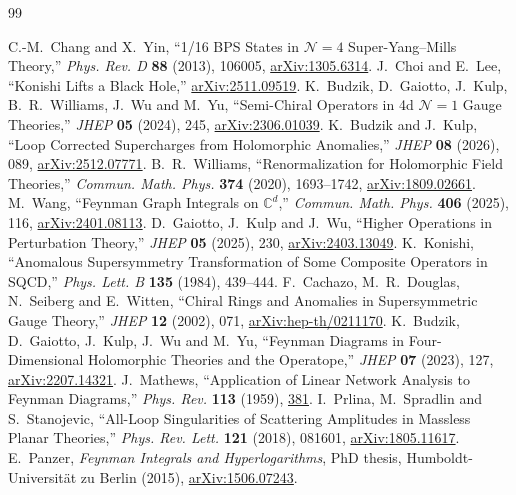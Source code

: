 \documentclass[11pt]{article}
\numberwithin{equation}{section}
\numberwithin{figure}{section}
\numberwithin{table}{section}
\begin{document}
\begin{thebibliography}{99}
\small\raggedright
{}
C.-M.~Chang and X.~Yin, ``1/16 BPS States in $\mathcal N=4$ Super-Yang--Mills Theory,'' \emph{Phys. Rev. D} \textbf{88} (2013), 106005, \href{https://arxiv.org/abs/1305.6314}{arXiv:1305.6314}.
J.~Choi and E.~Lee, ``Konishi Lifts a Black Hole,'' \href{https://arxiv.org/abs/2511.09519}{arXiv:2511.09519}.
K.~Budzik, D.~Gaiotto, J.~Kulp, B.~R.~Williams, J.~Wu and M.~Yu, ``Semi-Chiral Operators in 4d $\mathcal N=1$ Gauge Theories,'' \emph{JHEP} \textbf{05} (2024), 245, \href{https://arxiv.org/abs/2306.01039}{arXiv:2306.01039}.
K.~Budzik and J.~Kulp, ``Loop Corrected Supercharges from Holomorphic Anomalies,'' \emph{JHEP} \textbf{08} (2026), 089, \href{https://arxiv.org/abs/2512.07771}{arXiv:2512.07771}.
B.~R.~Williams, ``Renormalization for Holomorphic Field Theories,'' \emph{Commun. Math. Phys.} \textbf{374} (2020), 1693--1742, \href{https://arxiv.org/abs/1809.02661}{arXiv:1809.02661}.
M.~Wang, ``Feynman Graph Integrals on $\mathbb C^d$,'' \emph{Commun. Math. Phys.} \textbf{406} (2025), 116, \href{https://arxiv.org/abs/2401.08113}{arXiv:2401.08113}.
D.~Gaiotto, J.~Kulp and J.~Wu, ``Higher Operations in Perturbation Theory,'' \emph{JHEP} \textbf{05} (2025), 230, \href{https://arxiv.org/abs/2403.13049}{arXiv:2403.13049}.
K.~Konishi, ``Anomalous Supersymmetry Transformation of Some Composite Operators in SQCD,'' \emph{Phys. Lett. B} \textbf{135} (1984), 439--444.
F.~Cachazo, M.~R.~Douglas, N.~Seiberg and E.~Witten, ``Chiral Rings and Anomalies in Supersymmetric Gauge Theory,'' \emph{JHEP} \textbf{12} (2002), 071, \href{https://arxiv.org/abs/hep-th/0211170}{arXiv:hep-th/0211170}.
K.~Budzik, D.~Gaiotto, J.~Kulp, J.~Wu and M.~Yu, ``Feynman Diagrams in Four-Dimensional Holomorphic Theories and the Operatope,'' \emph{JHEP} \textbf{07} (2023), 127, \href{https://arxiv.org/abs/2207.14321}{arXiv:2207.14321}.
J.~Mathews, ``Application of Linear Network Analysis to Feynman Diagrams,'' \emph{Phys. Rev.} \textbf{113} (1959), \href{https://doi.org/10.1103/PhysRev.113.381}{381}.
I.~Prlina, M.~Spradlin and S.~Stanojevic, ``All-Loop Singularities of Scattering Amplitudes in Massless Planar Theories,'' \emph{Phys. Rev. Lett.} \textbf{121} (2018), 081601, \href{https://arxiv.org/abs/1805.11617}{arXiv:1805.11617}.
E.~Panzer, \emph{Feynman Integrals and Hyperlogarithms}, PhD thesis, Humboldt-Universit\"at zu Berlin (2015), \href{https://arxiv.org/abs/1506.07243}{arXiv:1506.07243}.

\end{thebibliography}
\end{document}
